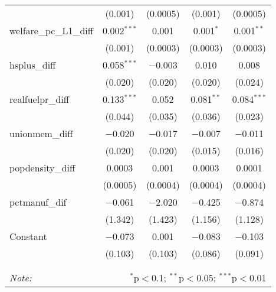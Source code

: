 \begin{table}[!htbp]
\begin{tabular}{@{\extracolsep{5pt}}lcccc}
  & (0.001) & (0.0005) & (0.001) & (0.0005) \\ 
  welfare\_pc\_L1\_diff & 0.002$^{***}$ & 0.001 & 0.001$^{*}$ & 0.001$^{**}$ \\ 
  & (0.001) & (0.0003) & (0.0003) & (0.0003) \\ 
  hsplus\_diff & 0.058$^{***}$ & $-$0.003 & 0.010 & 0.008 \\ 
  & (0.020) & (0.020) & (0.020) & (0.024) \\ 
  realfuelpr\_diff & 0.133$^{***}$ & 0.052 & 0.081$^{**}$ & 0.084$^{***}$ \\ 
  & (0.044) & (0.035) & (0.036) & (0.023) \\ 
  unionmem\_diff & $-$0.020 & $-$0.017 & $-$0.007 & $-$0.011 \\ 
  & (0.020) & (0.020) & (0.015) & (0.016) \\ 
  popdensity\_diff & 0.0003 & 0.001 & 0.0003 & 0.0001 \\ 
  & (0.0005) & (0.0004) & (0.0004) & (0.0004) \\ 
  pctmanuf\_dif & $-$0.061 & $-$2.020 & $-$0.425 & $-$0.874 \\ 
  & (1.342) & (1.423) & (1.156) & (1.128) \\ 
  Constant & $-$0.073 & 0.001 & $-$0.083 & $-$0.103 \\ 
  & (0.103) & (0.103) & (0.086) & (0.091) \\ 
 \hline \\[-1.8ex] 
\hline 
\hline \\[-1.8ex] 
\textit{Note:}  & \multicolumn{4}{r}{$^{*}$p$<$0.1; $^{**}$p$<$0.05; $^{***}$p$<$0.01} \\ 
\end{tabular} 
\end{table} 
